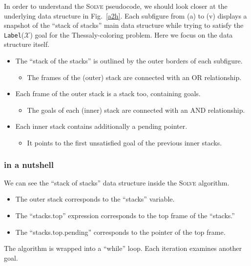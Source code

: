 \documentclass{ws-ijait}
\begin{document}
In order to understand the \textsc{Solve} pseudocode, we
should look closer at the underlying data structure in
Fig.~\ref{a2h}. Each subfigure from (a) to (v) displays a
snapshot of the ``stack of stacks'' main data structure
while trying to satisfy the \texttt{Label}($\mathscr{X}$)
goal for the Thessaly-coloring problem. Here we focus on the
data structure itself.
\begin{itemize}
  \item The ``stack of the stacks'' is outlined by the outer
        borders of each subfigure.
        \begin{itemize}
          \item The frames of the (outer) stack are
                connected with an \textsf{OR} relationship.
        \end{itemize}
  \item Each frame of the outer stack is a stack too,
        containing goals.
        \begin{itemize}
          \item The goals of each (inner) stack are
                connected with an \textsf{AND} relationship.
        \end{itemize}
  \item Each inner stack contains additionally a
        \textsf{pending} pointer.
        \begin{itemize}
          \item It points to the first unsatisfied goal of
                the previous inner stacks.
        \end{itemize}
\end{itemize}

\subsubsection{\SolveNormal{} in a nutshell}

We can see the ``stack of stacks'' data structure inside the
\textsc{Solve} algorithm.
\begin{itemize}
  \item The outer stack corresponds to the ``stacks''
        variable.
  \item The ``stacks.top'' expression corresponds to the top
        frame of the ``stacks.''
  \item The ``stacks.top.pending'' corresponds to the
        pointer of the top frame.
\end{itemize}

The algorithm is wrapped into a ``while'' loop. Each
iteration examines another goal.
\end{document}
